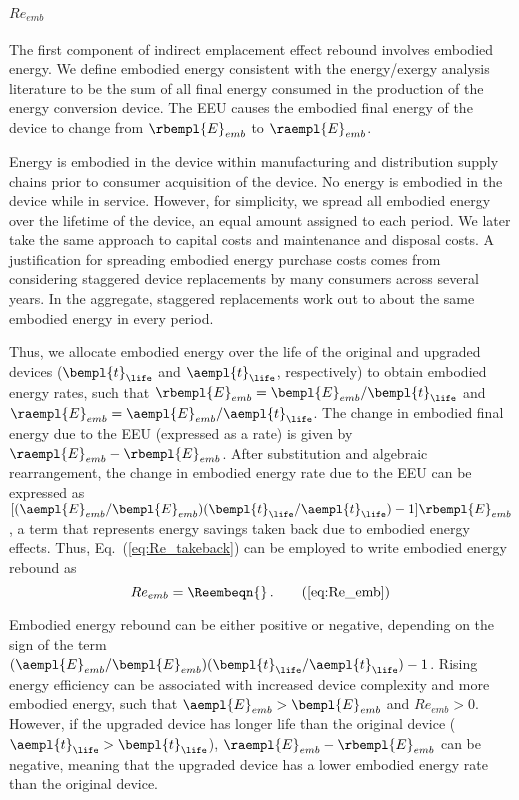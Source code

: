 \paragraph{$Re_{emb}$}
\label{sec:Re_emb}

The first component of indirect emplacement effect rebound
involves embodied energy.
We define embodied energy consistent with the energy/exergy analysis literature
to be the sum of all final energy consumed
in the production of the energy conversion device.
The EEU
causes the embodied final energy of the device to change
from $\rbempl{E}_{emb}$ to $\raempl{E}_{emb}$.

Energy is embodied in the device within manufacturing and distribution supply chains
prior to consumer acquisition of the device.
No energy is embodied in the device while in service.
However, for simplicity, we spread all embodied energy
over the lifetime of the device,
an equal amount assigned to each period.
We later take the same approach to capital costs and
maintenance and disposal costs.
A justification for spreading embodied energy purchase costs comes from considering
staggered device replacements by many consumers across several years.
In the aggregate, staggered replacements
work out to about the same embodied energy in every period.

Thus, we allocate embodied energy over the life of the original and upgraded devices
($\bempl{t}_{\life}$ and $\aempl{t}_{\life}$, respectively)
to obtain embodied energy rates, such that
$\rbempl{E}_{emb} = \bempl{E}_{emb} / \bempl{t}_{\life}$
and 
$\raempl{E}_{emb} = \aempl{E}_{emb} / \aempl{t}_{\life}$.
The change in embodied final energy due to the EEU (expressed as a rate) is given by
$\raempl{E}_{emb} - \rbempl{E}_{emb}$.
After substitution and algebraic rearrangement,
the change in embodied energy rate due to the EEU can be expressed as
$[ (\aempl{E}_{emb}/\bempl{E}_{emb})(\bempl{t}_{\life}/\aempl{t}_{\life}) - 1 ] \rbempl{E}_{emb}$, 
a term that represents energy savings taken back due to embodied energy effects.
Thus, Eq.~(\ref{eq:Re_takeback}) can be employed to write embodied energy rebound as
%
\begin{equation} 
  Re_{emb} = \Reembeqn{} \, . \tag{\ref{eq:Re_emb}}
\end{equation}

Embodied energy rebound can be either positive or negative, depending on 
the sign of the term
$(\aempl{E}_{emb}/\bempl{E}_{emb})(\bempl{t}_{\life}/\aempl{t}_{\life}) - 1$.
Rising energy efficiency can be associated with increased device complexity
and more embodied energy,
such that $\aempl{E}_{emb} > \bempl{E}_{emb}$ and $Re_{emb} > 0$.
However, if the upgraded device has longer life than the original device
($\aempl{t}_{\life} > \bempl{t}_{\life}$),
$\raempl{E}_{emb} - \rbempl{E}_{emb}$ can be negative,
meaning that the upgraded device has a lower embodied energy rate than the original device.


